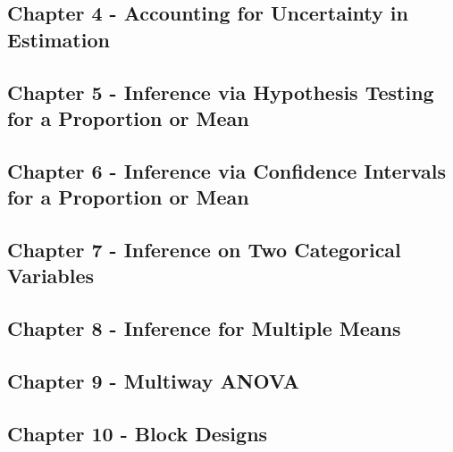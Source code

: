 \documentclass[
]{book}
\theoremstyle{definition}
\theoremstyle{definition}
\theoremstyle{definition}
\theoremstyle{remark}
\begin{document}
\hypertarget{chapter-4---accounting-for-uncertainty-in-estimation}{%
\subsection{Chapter 4 - Accounting for Uncertainty in Estimation}\label{chapter-4---accounting-for-uncertainty-in-estimation}}

\hypertarget{chapter-5---inference-via-hypothesis-testing-for-a-proportion-or-mean}{%
\subsection{Chapter 5 - Inference via Hypothesis Testing for a Proportion or Mean}\label{chapter-5---inference-via-hypothesis-testing-for-a-proportion-or-mean}}

\hypertarget{chapter-6---inference-via-confidence-intervals-for-a-proportion-or-mean}{%
\subsection{Chapter 6 - Inference via Confidence Intervals for a Proportion or Mean}\label{chapter-6---inference-via-confidence-intervals-for-a-proportion-or-mean}}

\hypertarget{chapter-7---inference-on-two-categorical-variables}{%
\subsection{Chapter 7 - Inference on Two Categorical Variables}\label{chapter-7---inference-on-two-categorical-variables}}

\hypertarget{chapter-8---inference-for-multiple-means}{%
\subsection{Chapter 8 - Inference for Multiple Means}\label{chapter-8---inference-for-multiple-means}}

\hypertarget{chapter-9---multiway-anova}{%
\subsection{Chapter 9 - Multiway ANOVA}\label{chapter-9---multiway-anova}}

\hypertarget{chapter-10---block-designs}{%
\subsection{Chapter 10 - Block Designs}\label{chapter-10---block-designs}}
\end{document}
